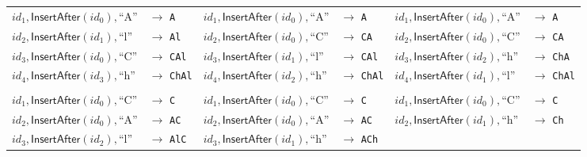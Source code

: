 \begin{figure}
\setlength{\tabcolsep}{3pt}
\begin{tabular}{ll|ll|ll}
$\mathit{id}_1, \mathsf{InsertAfter}(\mathit{id}_0), \text{``A''}$ & $\rightarrow$ \texttt{A} &
$\mathit{id}_1, \mathsf{InsertAfter}(\mathit{id}_0), \text{``A''}$ & $\rightarrow$ \texttt{A} &
$\mathit{id}_1, \mathsf{InsertAfter}(\mathit{id}_0), \text{``A''}$ & $\rightarrow$ \texttt{A} \\
$\mathit{id}_2, \mathsf{InsertAfter}(\mathit{id}_1), \text{``l''}$ & $\rightarrow$ \texttt{Al} &
$\mathit{id}_2, \mathsf{InsertAfter}(\mathit{id}_0), \text{``C''}$ & $\rightarrow$ \texttt{CA} &
$\mathit{id}_2, \mathsf{InsertAfter}(\mathit{id}_0), \text{``C''}$ & $\rightarrow$ \texttt{CA} \\
$\mathit{id}_3, \mathsf{InsertAfter}(\mathit{id}_0), \text{``C''}$ & $\rightarrow$ \texttt{CAl} &
$\mathit{id}_3, \mathsf{InsertAfter}(\mathit{id}_1), \text{``l''}$ & $\rightarrow$ \texttt{CAl} &
$\mathit{id}_3, \mathsf{InsertAfter}(\mathit{id}_2), \text{``h''}$ & $\rightarrow$ \texttt{ChA} \\
$\mathit{id}_4, \mathsf{InsertAfter}(\mathit{id}_3), \text{``h''}$ & $\rightarrow$ \texttt{ChAl} &
$\mathit{id}_4, \mathsf{InsertAfter}(\mathit{id}_2), \text{``h''}$ & $\rightarrow$ \texttt{ChAl} &
$\mathit{id}_4, \mathsf{InsertAfter}(\mathit{id}_1), \text{``l''}$ & $\rightarrow$ \texttt{ChAl} \\[6pt] \hline &&&&&\\[-6pt]
$\mathit{id}_1, \mathsf{InsertAfter}(\mathit{id}_0), \text{``C''}$ & $\rightarrow$ \texttt{C} &
$\mathit{id}_1, \mathsf{InsertAfter}(\mathit{id}_0), \text{``C''}$ & $\rightarrow$ \texttt{C} &
$\mathit{id}_1, \mathsf{InsertAfter}(\mathit{id}_0), \text{``C''}$ & $\rightarrow$ \texttt{C} \\
$\mathit{id}_2, \mathsf{InsertAfter}(\mathit{id}_0), \text{``A''}$ & $\rightarrow$ \texttt{AC} &
$\mathit{id}_2, \mathsf{InsertAfter}(\mathit{id}_0), \text{``A''}$ & $\rightarrow$ \texttt{AC} &
$\mathit{id}_2, \mathsf{InsertAfter}(\mathit{id}_1), \text{``h''}$ & $\rightarrow$ \texttt{Ch} \\
$\mathit{id}_3, \mathsf{InsertAfter}(\mathit{id}_2), \text{``l''}$ & $\rightarrow$ \texttt{AlC} &
$\mathit{id}_3, \mathsf{InsertAfter}(\mathit{id}_1), \text{``h''}$ & $\rightarrow$ \texttt{ACh} &

\end{tabular}
\end{figure}
